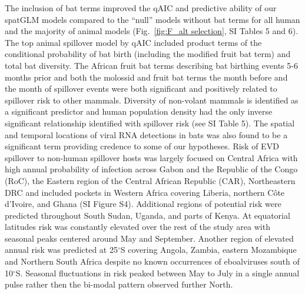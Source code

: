 \documentclass[a4paper,twoside, onecolumn]{article}
\begin{document}
	  The inclusion of bat terms improved the qAIC and predictive ability of our spatGLM models compared to the ``null'' models without bat terms for all human and the majority of animal models (Fig.~\ref{fig:F_alt selection}, SI Tables 5 and 6). The top animal spillover model by qAIC included product terms of the conditional probability of bat birth (including the modified fruit bat term) and total bat diversity. The African fruit bat terms describing bat birthing events 5-6 months prior and both the molossid and fruit bat terms the month before and the month of spillover events were both significant and positively related to spillover risk to other mammals. Diversity of non-volant mammals is identified as a significant predictor and human population density had the only inverse significant relationship identified with spillover risk (see SI Table 5). The spatial and temporal locations of viral RNA detections in bats was also found to be a significant term providing credence to some of our hypotheses. Risk of EVD spillover to non-human spillover hosts was largely focused on Central Africa with high annual probability of infection across Gabon and the Republic of the Congo (RoC), the Eastern region of the Central African Republic (CAR), Northeastern DRC and included pockets in Western Africa covering Liberia, northern C\^{o}te d'Ivoire, and Ghana (SI Figure S4). Additional regions of potential risk were predicted throughout South Sudan, Uganda, and parts of Kenya. At equatorial latitudes risk was constantly elevated over the rest of the study area with seasonal peaks centered around May and September. Another region of elevated annual risk was predicted at 25$^{\circ}$S covering Angola, Zambia, eastern Mozambique and Northern South Africa despite no known occurrences of eboalviruses south of 10$^{\circ}$S. Seasonal fluctuations in risk peaked between May to July in a single annual pulse rather then the bi-modal pattern observed further North.\par
\end{document}
